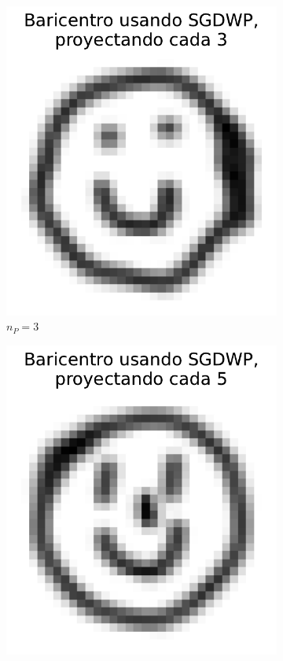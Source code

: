\begin{figure}[htbp]
\begin{subfigure}[b]{0.23\textwidth}
        \includegraphics[width=\textwidth]{img/sgdwp-pe/bar-SGDWP-pe-03.pdf}
        \caption{$n_P=3$}
        \label{fig:bar-SGDWP-pe-03}
    \end{subfigure}
    \hfill
    \begin{subfigure}[b]{0.23\textwidth}
        \centering
        \includegraphics[width=\textwidth]{img/sgdwp-pe/bar-SGDWP-pe-05.pdf}

\end{subfigure}
\end{figure}
